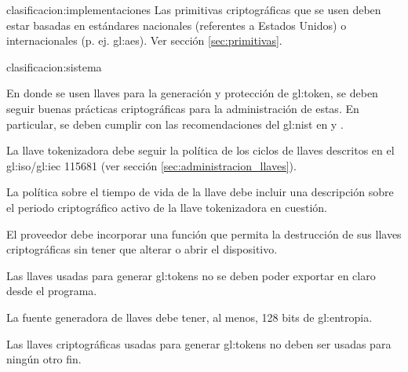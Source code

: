 {clasificacion:implementaciones}
{
  Las primitivas criptográficas que se usen deben estar basadas en
  estándares nacionales (referentes a Estados Unidos) o internacionales (p. ej.
  \gls{gl:aes}). Ver sección \ref{sec:primitivas}.
}



{clasificacion:sistema}
{
  En donde se usen llaves para la generación y protección de \gls{gl:token},
  se deben seguir buenas prácticas criptográficas para la administración de
  estas. En particular, se deben cumplir con las recomendaciones del
  \gls{gl:nist} en \cite{nist_llaves} y \cite{nist_disenio_llaves}.

  {
    La llave tokenizadora debe seguir la política de los ciclos de llaves
    descritos en el \acrshort{gl:iso}/\acrshort{gl:iec} 115681 (ver
    sección \ref{sec:administracion_llaves}).
  }

  {
    La política sobre el tiempo de vida de la llave debe incluir una
    descripción sobre el periodo criptográfico activo de la llave
    tokenizadora en cuestión.
  }

  {
   	El proveedor debe incorporar una función que permita la destrucción
   	de sus llaves criptográficas sin tener que alterar o abrir el
   	dispositivo.
  }

  {
    Las llaves usadas para generar \glspl{gl:token} no se deben poder
    exportar en claro desde el programa.
  }

  {
    La fuente generadora de llaves debe tener, al menos, 128 bits de
    \gls{gl:entropia}.
  }

  {
    Las llaves criptográficas usadas para generar \glspl{gl:token} no
    deben ser usadas para ningún otro fin.
  }
}

